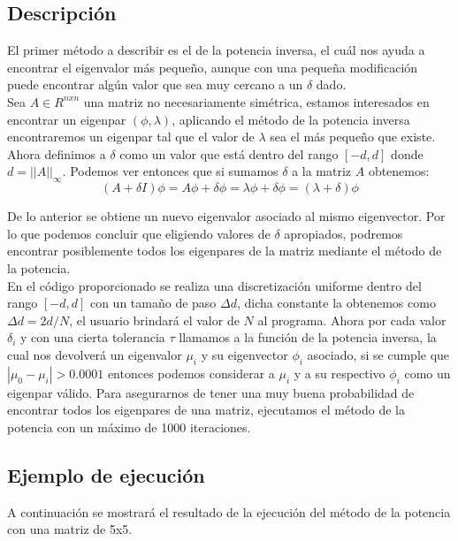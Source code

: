 \documentclass[12pt]{article}
\begin{document}
\subsection{Descripción}
El primer método a describir es el de la potencia inversa, el cuál nos ayuda a encontrar el eigenvalor más pequeño, aunque con una pequeña modificación puede encontrar algún valor que sea muy cercano a un $\delta$ dado.\\
Sea $A \in R^{nxn}$ una matriz no necesariamente simétrica, estamos interesados en encontrar un eigenpar $(\phi, \lambda)$, aplicando el método de la potencia inversa encontraremos un eigenpar tal que el valor de $\lambda$ sea el más pequeño que existe. Ahora definimos a $\delta$ como un valor que está dentro del rango $[-d, d]$ donde $d = ||A||_{\infty}$. Podemos ver entonces que si sumamos $\delta$ a la matriz $A$ obtenemos:\\
$$(A + \delta I)\phi = A\phi + \delta \phi = \lambda \phi + \delta \phi = (\lambda + \delta)\phi$$

De lo anterior se obtiene un nuevo eigenvalor asociado al mismo eigenvector. Por lo que podemos concluir que eligiendo valores de $\delta$ apropiados, podremos encontrar posiblemente todos los eigenpares de la matriz mediante el método de la potencia.\\
En el código proporcionado se realiza una discretización uniforme dentro del rango $[-d, d]$ con un tamaño de paso $\Delta d$, dicha constante la obtenemos como $\Delta d = 2d / N$, el usuario brindará el valor de $N$ al programa. Ahora por cada valor $\delta_i$ y con una cierta tolerancia $\tau$ llamamos a la función de la potencia inversa, la cual nos devolverá un eigenvalor $\mu_i$ y su eigenvector $\phi_i$ asociado, si se cumple que $|\mu_0 - \mu_i| > 0.0001$ entonces podemos considerar a $\mu_i$ y a su respectivo $\phi_i$ como un eigenpar válido. Para asegurarnos de tener una muy buena probabilidad de encontrar todos los eigenpares de una matriz, ejecutamos el método de la potencia con un máximo de 1000 iteraciones.

\subsection{Ejemplo de ejecución}
A continuación se mostrará el resultado de la ejecución del método de la potencia con una matriz de 5x5.\\

\begin{figure}[H]
	\centering
	\hfill
\end{figure}
\end{document}
